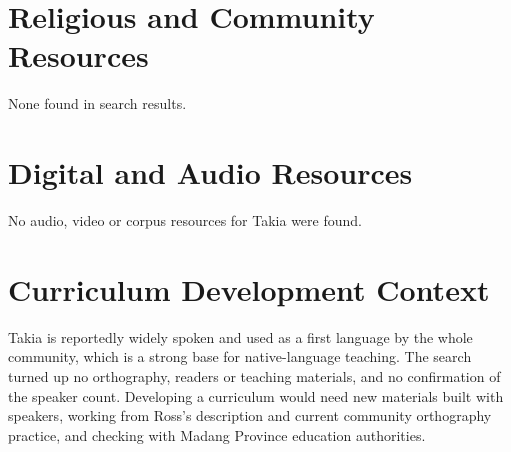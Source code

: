 \documentclass[12pt]{article}
\begin{document}
\section{Religious and Community Resources}
None found in search results.

\section{Digital and Audio Resources}
No audio, video or corpus resources for Takia were found.

\section{Curriculum Development Context}
Takia is reportedly widely spoken and used as a first language by the whole community, which is a strong base for native-language teaching. The search turned up no orthography, readers or teaching materials, and no confirmation of the speaker count. Developing a curriculum would need new materials built with speakers, working from Ross's description and current community orthography practice, and checking with Madang Province education authorities.
\end{document}
